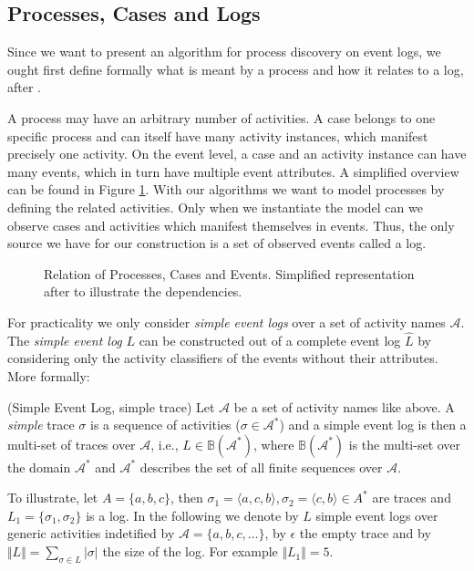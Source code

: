 \documentclass[a4paper]{IEEEtran}
\begin{document}
\subsection{Processes, Cases and Logs}
Since we want to present an algorithm for process discovery on event logs, we ought first define formally what is meant by a process and how it relates to a log, after \cite{process_mining}.

A process may have an arbitrary number of activities. A case belongs to one specific process and can itself have many activity instances, which manifest precisely one activity. On the event level, a case and an activity instance can have many events, which in turn have multiple event attributes. A simplified overview  can be found in Figure \ref{fig:processes}. With our algorithms we want to model processes by defining the related activities. Only when we instantiate the model can we observe cases and activities which manifest themselves in events. Thus, the only source we have for our construction is a set of observed events called a log.  

\begin{figure}[h!]
    \centering
    \caption{Relation of Processes, Cases and Events. Simplified representation after \cite{process_mining} to illustrate the dependencies. }
    \label{fig:processes}
\end{figure}
For practicality we only consider \textit{simple event logs} over a set of activity names $\mathcal{A}$. The \textit{simple event log} $L$ can be constructed out of a complete event log $\hat{L}$ by considering only the activity classifiers of the events without their attributes. More formally:
\begin{defn} (Simple Event Log, simple trace) \cite{inductivemining-constructive}
Let $\mathcal{A}$ be a set of activity names like above. A \textit{simple} trace $\sigma$ is a sequence of activities ($\sigma \in \mathcal{A}^*$) and a simple event log is then a multi-set of traces over $\mathcal{A}$, i.e., $L \in \mathbb{B}(\mathcal{A}^*)$, where $\mathbb{B}(\mathcal{A}^*)$ is the multi-set over the domain $\mathcal{A}^*
$ and $\mathcal{A}^*$ describes the set of all finite sequences over $\mathcal{A}$.
\end{defn}
To illustrate, let $A = \{ a,b,c \} $, then $ \sigma_1 = \langle a, c, b\rangle, \sigma_2 = \langle c, b\rangle \in A^*$ are traces and $L_1 = \{ \sigma_1, \sigma_2 \}$ is a log.
In the following we denote by $L$ simple event logs over generic activities indetified by $\mathcal{A} = \{a, b, c, \dots \}$, by $\epsilon$ the empty trace and by $\Vert L \Vert = \sum_{\sigma \in L} |\sigma|$ the size of the log. For example $ \Vert L_1 \Vert = 5$.
\end{document}
